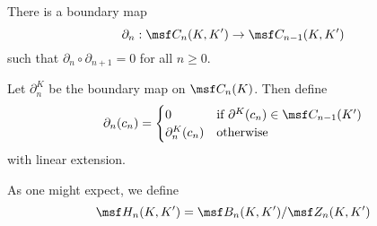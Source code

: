 
\begin{problem}[18.16]
  There is a boundary map
  \[
    \partial_n : \msf C_n(K, K') \to \msf C_{n-1}(K, K')
  \]
  such that $\partial_n \circ \partial_{n+1} = 0$ for all $n \geq 0$.
\end{problem}
\begin{solution}
  Let $\partial^{K}_n$ be the boundary map on $\msf C_n(K)$. Then
  define
  \[
    \partial_{n}(c_n)
    =
    \begin{cases}
      0 & \text{if } \partial^K(c_n) \in \msf C_{n-1}(K') \\
      \partial^K_n(c_n) & \text{otherwise }
    \end{cases}
  \]
  with linear extension.
\end{solution}

\begin{definition}
  As one might expect, we define
  \[
    \msf H_n(K, K')
    = \msf B_n(K, K') / \msf Z_n(K, K')
  \]
\end{definition}

